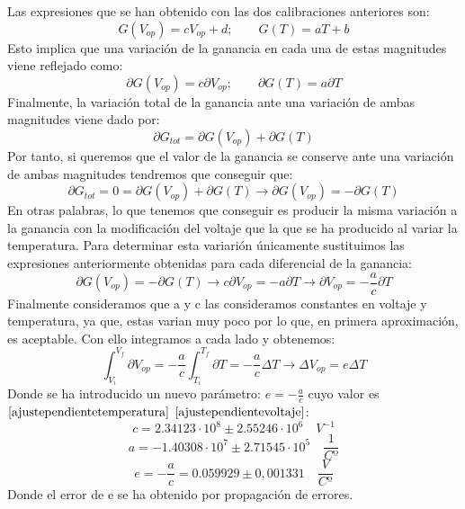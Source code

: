 Las expresiones que se han obtenido con las dos calibraciones anteriores son:
\begin{equation}
G(V_{op})=cV_{op}+d; \qquad G(T)=aT+b
\label{gananciatotal}
\end{equation}
Esto implica que una variación de la ganancia en cada una de estas magnitudes viene reflejado como:
\begin{equation}
\partial G(V_{op}) = c \partial V_{op}; \qquad \partial G(T) = a \partial T
\label{variacionparcialganancia}
\end{equation}
Finalmente, la variación total de la ganancia ante una variación de ambas magnitudes viene dado por:
\begin{equation}
\partial G_{tot} = \partial G(V_{op}) + \partial G(T)
\label{variaciontotalganancia}
\end{equation}
Por tanto, si queremos que el valor de la ganancia se conserve ante una variación de ambas magnitudes tendremos que conseguir que: 
\begin{equation}
\partial G_{tot} = 0 =  \partial G(V_{op}) + \partial G(T) \longrightarrow \partial G(V_{op}) = -\partial G(T)  
\label{basecompensacion}
\end{equation}
En otras palabras, lo que tenemos que conseguir es producir la misma variación a la ganancia con la modificación del voltaje que la que se ha producido al variar la temperatura. Para determinar esta variarión únicamente sustituimos las expresiones anteriormente obtenidas para cada diferencial de la ganancia:
\begin{equation}
\partial G(V_{op}) = - \partial G(T)  \longrightarrow c \partial V_{op}= - a \partial T \longrightarrow  \partial V_{op}= - \frac{a}{c} \partial T
\label{compensacionparciales}
\end{equation}
Finalmente consideramos que a y c las consideramos constantes en voltaje y temperatura, ya que, estas varian muy poco por lo que, en primera aproximación, es aceptable. Con ello integramos a cada lado y obtenemos:
\begin{equation}
\int_{V_i}^{V_f} \partial V_{op}= - \frac{a}{c} \int_{T_i}^{T_f}\partial T = - \frac{a}{c} \Delta T \longrightarrow \Delta V_{op}= e \Delta T
\label{integral}
\end{equation}
Donde se ha introducido un nuevo parámetro: $e=-\frac{a}{c}$ cuyo valor es $\eqref{ajustependientetemperatura}$ $\eqref{ajustependientevoltaje}$:
\begin{equation}
c=2.34123 \cdot 10^8 \pm 2.55246 \cdot 10^6 \quad V^{-1}
\label{pendientevoltaje}
\end{equation}
\begin{equation}
a=-1.40308 \cdot 10^7 \pm 2.71545 \cdot 10^5 \quad \frac{1}{Cº}
\label{pendientetemperatura}
\end{equation}
\begin{equation}
e=-\frac{a}{c} = 0.059929 \pm 0,001331 \quad \frac{V}{Cº}
\label{pendientecompensacion}
\end{equation}
Donde el error de e se ha obtenido por propagación de errores. 

